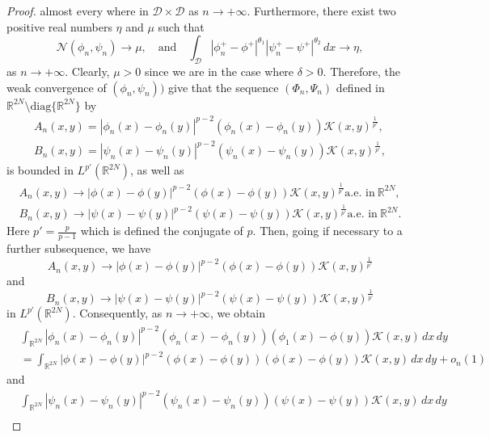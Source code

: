 \documentclass[reqno]{amsart}
\begin{document}
\begin{proof}
almost every where in $\mathcal{D}\times\mathcal{D}$ as $n\to +\infty$. Furthermore,
there exist two positive real numbers $\eta$ and $\mu$ such that
\begin{equation}\label{K0}
\mathcal{N}(\phi_n,\psi_n)\to \mu,\quad \text{and}\quad
\int_\mathcal{D} |\phi^+_n-\phi^+|^{\theta_1}|\psi^+_n-\psi^+|^{\theta_2}\,dx\to \eta,
\end{equation}
as $n\to +\infty$. Clearly, $\mu>0$ since we are in the case where $\delta>0$.
Therefore, the weak convergence of $(\phi_n,\psi_n))$ give that the sequence
$(\Phi_n,\Psi_n)$ defined in
$\mathbb{R}^{2N}\setminus \text{diag}\lbrace \mathbb{R}^{2N}\rbrace$ by
\begin{gather*}
A_n(x,y)=|\phi_n(x)-\phi_n(y)|^{p-2}(\phi_n(x)-\phi_n(y))\mathcal{K}(x,y)^\frac{1}{p'},\\
B_n(x,y)=|\psi_n(x)-\psi_n(y)|^{p-2}(\psi_n(x)-\psi_n(y))\mathcal{K}(x,y)^\frac{1}{p'},
\end{gather*}
is bounded in $L^{p'}(\mathbb{R}^{2N})$, as well as
\begin{gather*}
A_n(x,y)\longrightarrow |\phi(x)-\phi(y)|^{p-2}(\phi(x)
-\phi(y))\mathcal{K}(x,y)^\frac{1}{p'} \text{a.e. in}\ \mathbb{R}^{2N}, \\
B_n(x,y)\longrightarrow |\psi(x)-\psi(y)|^{p-2}(\psi(x)
 -\psi(y))\mathcal{K}(x,y)^\frac{1}{p'} \text{a.e. in}\ \mathbb{R}^{2N}.
\end{gather*}
Here $p'=\frac{p}{p-1}$ which is defined the conjugate of $p$.
Then, going if necessary to a further subsequence, we have
$$
A_n(x,y)\longrightarrow |\phi(x)-\phi(y)|^{p-2}(\phi(x)-\phi(y))
\mathcal{K}(x,y)^\frac{1}{p'}
$$
and
$$
B_n(x,y)\longrightarrow |\psi(x)-\psi(y)|^{p-2}(\psi(x)-\psi(y))
\mathcal{K}(x,y)^\frac{1}{p'}
$$
in $L^{p'}(\mathbb{R}^{2N})$. Consequently, as $n\to +\infty$, we obtain
\begin{equation} \label{K1}
\begin{aligned}
&\int_{\mathbb{R}^{2N}}|\phi_n(x)-\phi_n(y)|^{p-2}(\phi_n(x)
 -\phi_n(y))(\phi_1(x)-\phi(y))\mathcal{K}(x,y)\,dx\,dy\\
&= \int_{\mathbb{R}^{2N}}|\phi(x)-\phi(y)|^{p-2}(\phi(x)-\phi(y))(\phi(x)
 -\phi(y))\mathcal{K}(x,y)\,dx\,dy+o_n(1)
\end{aligned}
\end{equation}
and
\begin{equation} \label{K2}
\begin{aligned}
&\int_{\mathbb{R}^{2N}}|\psi_n(x)-\psi_n(y)|^{p-2}(\psi_n(x)
 -\psi_n(y))(\psi(x)-\psi(y))\mathcal{K}(x,y)\,dx\,dy\\

\end{aligned}
\end{equation}
\end{proof}
\end{document}
